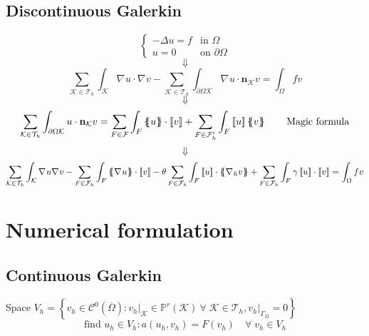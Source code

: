 \documentclass[a4paper,11pt]{article}
\theoremstyle{break}
\renewcommand*{\grad}{\nabla\mspace{1mu}}
\newcommand{\vect}[1]{\textbf{#1}}
\newcommand*{\txt}[1]{\text{#1}}
\newcommand*{\limited}[1]{\vert_{#1}}
\newcommand{\jump}[1]{\left[\!\left[#1\right]\!\right]}
\newcommand{\average}[1]{\left\{\mspace{-6.5mu}\left\{#1\right\}\mspace{-6.5mu}\right\}}
\newcommand{\element}{\mathcal{K}}
\newcommand{\triangulation}{\mathcal{T}_h}
\newcommand{\boundary}{{\partial\Omega}}
\newcommand{\eit}{{\element\in\triangulation}}
\newcommand{\normal}{\vect{n}}
\newcommand{\find}{\txt{find }}
\numberwithin{equation}{section}
\begin{document}
\subsection*{Discontinuous Galerkin}
\begin{equation*}
    \begin{cases}
        -\Delta u = f & \txt{in }\Omega \\
        u = 0 & \txt{on }\boundary
    \end{cases}
\end{equation*}
\[
    \Downarrow
\]
\[
    \sum_{\eit}\int_\element \grad u \cdot \grad v - \sum_\eit \int_{\boundary\element} \grad u \cdot \normal_\element v = \int_\Omega fv
\]
\[
    \Downarrow
\]
\begin{equation*}
    \sum_{\eit} \int_{\boundary\element} u \cdot \normal_\element v = \sum_{F \in \mathcal{F}} \int_F \average{u} \cdot \jump{v} + \sum_{F \in \mathcal{F}'_h} \int_F \jump{u}\average{v} \tag*{Magic formula}
\end{equation*}
\[\Downarrow\]
\begin{equation*}
    \begin{split}
        \sum_\eit \int_\element \grad u \grad v - \sum_{F \in \mathcal{F}_h} \int_F \average{\grad u} \cdot \jump{v} 
        -\theta \sum_{F \in \mathcal{F}_h} \int_F \jump{u} \cdot \average{\grad_h v} + \sum_{F \in \mathcal{F}_h} \int_F \gamma \jump{u} \cdot \jump{v} = \int_\Omega fv
    \end{split}
\end{equation*}
\section*{Numerical formulation}
\subsection*{Continuous Galerkin}
Space \(V_h = \left\{ v_h \in \mathcal{C}^0(\overline{\Omega}) : v_h\limited{\element} \in \mathbb{P}^r(\element) \ \forall \; \eit, v_h\limited{\Gamma_D} = 0 \right\}\)
\[
    \find u_h \in V_h : a(u_h,v_h) = F(v_h) \quad \forall \; v_h \in V_h
\]
\end{document}
